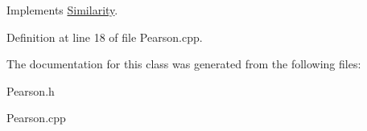 Implements \hyperlink{classSimilarity_a3ff3d3622d8a45b15531bc143308b2ae}{Similarity}.

Definition at line 18 of file Pearson.cpp.

The documentation for this class was generated from the following files:\begin{DoxyCompactItemize}
\item 
Pearson.h\item 
Pearson.cpp\end{DoxyCompactItemize}
